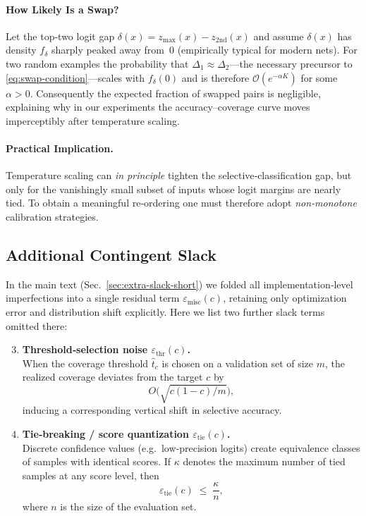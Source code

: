 \paragraph{How Likely Is a Swap?}
Let the top‑two logit gap
\(
\delta(x)=z_{\max}(x)-z_{2\text{nd}}(x)
\)
and assume \(\delta(x)\) has density \(f_\delta\) sharply peaked away
from~\(0\) (empirically typical for modern nets).  For two random
examples the probability that \(\Delta_1\approx\Delta_2\)---the
necessary precursor to \eqref{eq:swap-condition}---scales with
\(f_\delta(0)\) and is therefore \(\mathcal{O}(e^{-\alpha K})\) for
some \(\alpha>0\).  Consequently the expected fraction of swapped pairs
is negligible, explaining why in our experiments the
accuracy--coverage curve moves imperceptibly after temperature scaling.

\paragraph{Practical Implication.}
Temperature scaling can \emph{in principle} tighten the
selective‑classification gap, but only for the vanishingly small subset
of inputs whose logit margins are nearly tied.  To obtain a meaningful
re‑ordering one must therefore adopt \emph{non‑monotone} calibration strategies.%


\subsection{Additional Contingent Slack}
\label{app:extra-slack-omitted}

In the main text (Sec.~\ref{sec:extra-slack-short}) we folded all implementation‐level imperfections into a single residual term \(\varepsilon_{\text{misc}}(c)\), retaining only optimization error and distribution shift explicitly. Here we list two further slack terms omitted there:

\begin{enumerate}[leftmargin=1.2em]
  \setcounter{enumi}{2}
  \item \textbf{Threshold‐selection noise \(\varepsilon_{\text{thr}}(c)\).}\\
    When the coverage threshold \(\hat t_c\) is chosen on a validation set of size \(m\), the realized coverage deviates from the target \(c\) by 
    \begin{equation}
      O\bigl(\sqrt{c(1-c)/m}\bigr),
    \end{equation}
    inducing a corresponding vertical shift in selective accuracy.

  \item \textbf{Tie‐breaking / score quantization \(\varepsilon_{\text{tie}}(c)\).}\\
    Discrete confidence values (e.g.\ low‐precision logits) create equivalence classes of samples with identical scores.  If \(\kappa\) denotes the maximum number of tied samples at any score level, then
    \begin{equation}
      \varepsilon_{\text{tie}}(c)
      \;\le\;
      \frac{\kappa}{n},
    \end{equation}
    where \(n\) is the size of the evaluation set.
\end{enumerate}

